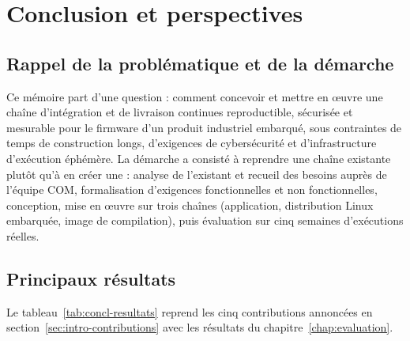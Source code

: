 \chapter{Conclusion et perspectives}
\label{chap:conclusion}

\section{Rappel de la problématique et de la démarche}
\label{sec:concl-rappel}

Ce mémoire part d'une question : comment concevoir et mettre en œuvre une
chaîne d'intégration et de livraison continues reproductible, sécurisée et
mesurable pour le firmware d'un produit industriel embarqué, sous contraintes
de temps de construction longs, d'exigences de cybersécurité et
d'infrastructure d'exécution éphémère. La démarche a consisté à reprendre une
chaîne existante plutôt qu'à en créer une : analyse de l'existant et recueil des
besoins auprès de l'équipe COM, formalisation d'exigences fonctionnelles et non
fonctionnelles, conception, mise en œuvre sur trois chaînes (application,
distribution Linux embarquée, image de compilation), puis évaluation sur cinq
semaines d'exécutions réelles.

\section{Principaux résultats}
\label{sec:concl-resultats}

Le tableau~\ref{tab:concl-resultats} reprend les cinq contributions annoncées
en section~\ref{sec:intro-contributions} avec les résultats du
chapitre~\ref{chap:evaluation}.

